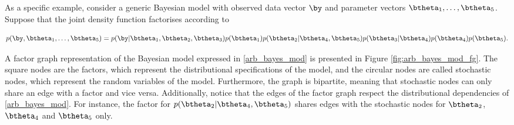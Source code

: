 \documentclass[12pt]{article}
\theoremstyle{plain}
\theoremstyle{definition}
\theoremstyle{remark}
\begin{document}
As a specific example,
consider a generic Bayesian model with observed data vector $\by$ and parameter vectors $\btheta_1, \dots,
\btheta_5$. Suppose that the joint density function factorises according to

\begin{equation}
	p (\by, \btheta_1, \dots, \btheta_5) =
		p (\by | \btheta_1, \btheta_2, \btheta_3) p (\btheta_1) p (\btheta_2 | \btheta_4, \btheta_5)
		p (\btheta_3 | \btheta_4) p (\btheta_4) p (\btheta_5).
\label{arb_bayes_mod}
\end{equation}

\noindent A factor graph representation of the Bayesian model expressed in \eqref{arb_bayes_mod} is presented
in Figure \ref{fig:arb_bayes_mod_fg}. The square nodes are the factors, which represent the distributional
specifications of the model, and the circular nodes are called stochastic nodes, which represent the random
variables of the model. Furthermore, the graph is bipartite, meaning that stochastic nodes can only share an
edge with a factor and vice versa. Additionally, notice that the edges of the factor graph respect the distributional
dependencies of \eqref{arb_bayes_mod}. For instance, the factor for $p (\btheta_2 | \btheta_4, \btheta_5)$
shares edges with the stochastic nodes for $\btheta_2$, $\btheta_4$ and $\btheta_5$ only.
\end{document}
